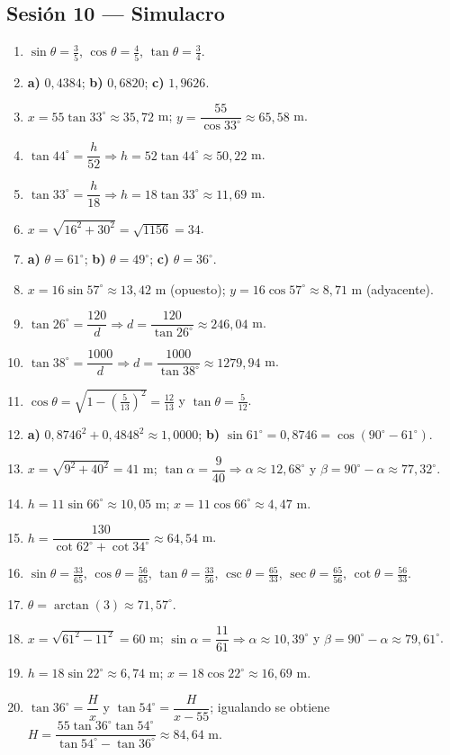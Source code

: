 \documentclass[12pt, letterpaper]{article}
\providecommand{\sen}{\sin}
\begin{document}
\subsection*{Sesión 10 — Simulacro}
\begin{enumerate}[leftmargin=*, label=\textbf{\arabic*.}]
  \item $\sen\theta=\frac{3}{5}$, $\cos\theta=\frac{4}{5}$, $\tan\theta=\frac{3}{4}$.
  \item \textbf{a)} $0{,}4384$; \quad \textbf{b)} $0{,}6820$; \quad \textbf{c)} $1{,}9626$.
  \item $x=55\tan 33^{\circ}\approx 35{,}72$ m; $y=\dfrac{55}{\cos 33^{\circ}}\approx 65{,}58$ m.
  \item $\tan 44^{\circ}=\dfrac{h}{52}\Rightarrow h=52\tan 44^{\circ}\approx 50{,}22$ m.
  \item $\tan 33^{\circ}=\dfrac{h}{18}\Rightarrow h=18\tan 33^{\circ}\approx 11{,}69$ m.
  \item $x=\sqrt{16^2+30^2}=\sqrt{1156}=34$.
  \item \textbf{a)} $\theta=61^{\circ}$; \quad \textbf{b)} $\theta=49^{\circ}$; \quad \textbf{c)} $\theta=36^{\circ}$.
  \item $x=16\sen 57^{\circ}\approx 13{,}42$ m (opuesto); $y=16\cos 57^{\circ}\approx 8{,}71$ m (adyacente).
  \item $\tan 26^{\circ}=\dfrac{120}{d}\Rightarrow d=\dfrac{120}{\tan 26^{\circ}}\approx 246{,}04$ m.
  \item $\tan 38^{\circ}=\dfrac{1000}{d}\Rightarrow d=\dfrac{1000}{\tan 38^{\circ}}\approx 1279{,}94$ m.
  \item $\cos\theta=\sqrt{1-\left(\frac{5}{13}\right)^2}=\frac{12}{13}$ y $\tan\theta=\frac{5}{12}$.
  \item \textbf{a)} $0{,}8746^2+0{,}4848^2\approx 1{,}0000$; \quad \textbf{b)} $\sen 61^{\circ}=0{,}8746=\cos(90^{\circ}-61^{\circ})$. \checkmark
  \item $x=\sqrt{9^2+40^2}=41$ m; $\tan\alpha=\dfrac{9}{40}\Rightarrow\alpha\approx 12{,}68^{\circ}$ y $\beta=90^{\circ}-\alpha\approx 77{,}32^{\circ}$.
  \item $h=11\sen 66^{\circ}\approx 10{,}05$ m; $x=11\cos 66^{\circ}\approx 4{,}47$ m.
  \item $h=\dfrac{130}{\cot 62^{\circ}+\cot 34^{\circ}}\approx 64{,}54$ m.
  \item $\sen\theta=\frac{33}{65}$, $\cos\theta=\frac{56}{65}$, $\tan\theta=\frac{33}{56}$, $\csc\theta=\frac{65}{33}$, $\sec\theta=\frac{65}{56}$, $\cot\theta=\frac{56}{33}$.
  \item $\theta=\arctan\left(3\right)\approx 71{,}57^{\circ}$.
  \item $x=\sqrt{61^2-11^2}=60$ m; $\sen\alpha=\dfrac{11}{61}\Rightarrow\alpha\approx 10{,}39^{\circ}$ y $\beta=90^{\circ}-\alpha\approx 79{,}61^{\circ}$.
  \item $h=18\sen 22^{\circ}\approx 6{,}74$ m; $x=18\cos 22^{\circ}\approx 16{,}69$ m.
  \item $\tan 36^{\circ}=\dfrac{H}{x}$ y $\tan 54^{\circ}=\dfrac{H}{x-55}$; igualando se obtiene $H=\dfrac{55\tan 36^{\circ}\tan 54^{\circ}}{\tan 54^{\circ}-\tan 36^{\circ}}\approx 84{,}64$ m.
\end{enumerate}
\end{document}
